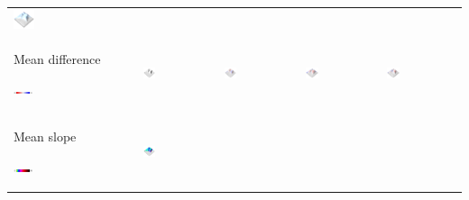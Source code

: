 \documentclass[Afour,sageh,times]{sagej}
\begin{document}
\begin{table}[h]
\begin{tabular}{m{} m{} m{} m{} m{}}
\includegraphics[width=0.18\textwidth]{images/render_3d/participants/stdev_regression_difference_series_3.png}\\
%
Mean difference \par \vspace{0.5em} \includegraphics[width=0.16\textwidth]{images/legends/diff_legend.pdf} & 
\includegraphics[width=0.18\textwidth]{images/render_3d/participants/dem_difference_1.png} &
\includegraphics[width=0.18\textwidth]{images/render_3d/participants/mean_dem_regression_difference_1.png} &
\includegraphics[width=0.18\textwidth]{images/render_3d/participants/mean_dem_regression_difference_2.png} &
\includegraphics[width=0.18\textwidth]{images/render_3d/participants/mean_dem_regression_difference_3.png}\\
%
Mean slope \par \vspace{0.5em} \includegraphics[width=0.16\textwidth]{images/legends/slope_legend.pdf} & 
\includegraphics[width=0.18\textwidth]{images/render_3d/participants/slope_1.png} &

\end{tabular}
\end{table}
\end{document}
